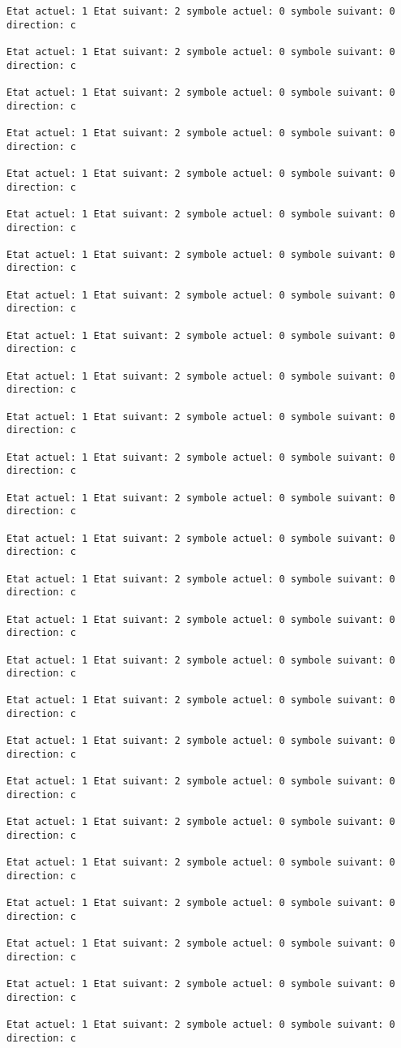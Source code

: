 \documentclass{article}
\begin{document}
\begin{verbatim}
Etat actuel: 1 Etat suivant: 2 symbole actuel: 0 symbole suivant: 0 direction: c

Etat actuel: 1 Etat suivant: 2 symbole actuel: 0 symbole suivant: 0 direction: c

Etat actuel: 1 Etat suivant: 2 symbole actuel: 0 symbole suivant: 0 direction: c

Etat actuel: 1 Etat suivant: 2 symbole actuel: 0 symbole suivant: 0 direction: c

Etat actuel: 1 Etat suivant: 2 symbole actuel: 0 symbole suivant: 0 direction: c

Etat actuel: 1 Etat suivant: 2 symbole actuel: 0 symbole suivant: 0 direction: c

Etat actuel: 1 Etat suivant: 2 symbole actuel: 0 symbole suivant: 0 direction: c

Etat actuel: 1 Etat suivant: 2 symbole actuel: 0 symbole suivant: 0 direction: c

Etat actuel: 1 Etat suivant: 2 symbole actuel: 0 symbole suivant: 0 direction: c

Etat actuel: 1 Etat suivant: 2 symbole actuel: 0 symbole suivant: 0 direction: c

Etat actuel: 1 Etat suivant: 2 symbole actuel: 0 symbole suivant: 0 direction: c

Etat actuel: 1 Etat suivant: 2 symbole actuel: 0 symbole suivant: 0 direction: c

Etat actuel: 1 Etat suivant: 2 symbole actuel: 0 symbole suivant: 0 direction: c

Etat actuel: 1 Etat suivant: 2 symbole actuel: 0 symbole suivant: 0 direction: c

Etat actuel: 1 Etat suivant: 2 symbole actuel: 0 symbole suivant: 0 direction: c

Etat actuel: 1 Etat suivant: 2 symbole actuel: 0 symbole suivant: 0 direction: c

Etat actuel: 1 Etat suivant: 2 symbole actuel: 0 symbole suivant: 0 direction: c

Etat actuel: 1 Etat suivant: 2 symbole actuel: 0 symbole suivant: 0 direction: c

Etat actuel: 1 Etat suivant: 2 symbole actuel: 0 symbole suivant: 0 direction: c

Etat actuel: 1 Etat suivant: 2 symbole actuel: 0 symbole suivant: 0 direction: c

Etat actuel: 1 Etat suivant: 2 symbole actuel: 0 symbole suivant: 0 direction: c

Etat actuel: 1 Etat suivant: 2 symbole actuel: 0 symbole suivant: 0 direction: c

Etat actuel: 1 Etat suivant: 2 symbole actuel: 0 symbole suivant: 0 direction: c

Etat actuel: 1 Etat suivant: 2 symbole actuel: 0 symbole suivant: 0 direction: c

Etat actuel: 1 Etat suivant: 2 symbole actuel: 0 symbole suivant: 0 direction: c

Etat actuel: 1 Etat suivant: 2 symbole actuel: 0 symbole suivant: 0 direction: c
\end{verbatim}
\end{document}
